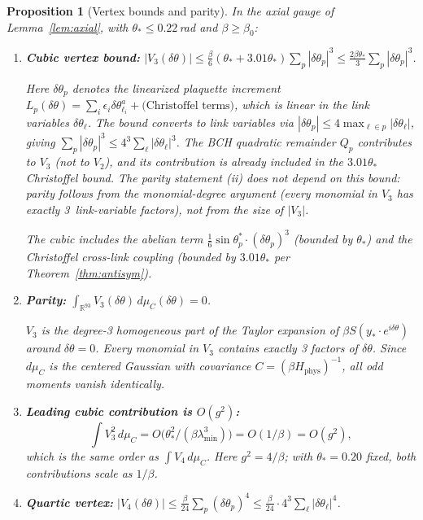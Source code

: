 \documentclass[11pt]{article}
\newtheorem{proposition}[theorem]{Proposition}
\theoremstyle{definition}
\newcommand{\R}{\mathbb{R}}
\begin{document}
\begin{proposition}[Vertex bounds and parity]\label{prop:vertex}
In the axial gauge of Lemma~\ref{lem:axial}, with $\theta_*\le 0.22$\,rad
and $\beta\ge\beta_0$:
\begin{enumerate}[nosep,label=(\roman*)]
\item \textbf{Cubic vertex bound:}
$|V_3(\delta\theta)|
\le\frac{\beta}{6}(\theta_*+3.01\theta_*)\sum_p|\delta\theta_p|^3
\le\frac{2\beta\theta_*}{3}\sum_p|\delta\theta_p|^3$.

Here $\delta\theta_p$ denotes the \emph{linearized plaquette
increment} $L_p(\delta\theta)=\sum_i\epsilon_i\delta\theta_{\ell_i}^a
+\text{(Christoffel terms)}$, which is \emph{linear} in the
link variables $\delta\theta_\ell$.  The bound converts to link
variables via $|\delta\theta_p|\le 4\max_{\ell\in p}
|\delta\theta_\ell|$, giving
$\sum_p|\delta\theta_p|^3\le 4^3\sum_\ell|\delta\theta_\ell|^3$.
The BCH quadratic remainder $Q_p$ contributes to $V_3$ (not to
$V_2$), and its contribution is already included in the
$3.01\theta_*$ Christoffel bound.
\emph{The parity statement (ii) does not depend on this bound}:
parity follows from the monomial-degree argument (every monomial
in $V_3$ has exactly 3~link-variable factors), not from the
size of $|V_3|$.

The cubic includes the abelian term
$\frac{1}{6}\sin\theta_p^*\cdot(\delta\theta_p)^3$ (bounded by
$\theta_*$) and the Christoffel cross-link coupling
(bounded by $3.01\theta_*$ per Theorem~\ref{thm:antisym}).

\item \textbf{Parity:}
$\int_{\R^{93}} V_3(\delta\theta)\,d\mu_C(\delta\theta) = 0$.

$V_3$ is the degree-3 homogeneous part of the Taylor expansion
of $\beta S(y_*\cdot e^{i\delta\theta})$ around $\delta\theta=0$.
Every monomial in $V_3$ contains \emph{exactly 3} factors of
$\delta\theta$.  Since $d\mu_C$ is the centered Gaussian with
covariance $C=(\beta H_{\mathrm{phys}})^{-1}$, all odd moments
vanish identically.

\item \textbf{Leading cubic contribution is $O(g^2)$:}
\begin{equation}\label{eq:V3sq-scale}
\int V_3^2\,d\mu_C=O\bigl(\theta_*^2/(\beta\lambda_{\min}^3)\bigr)
=O(1/\beta)=O(g^2),
\end{equation}
which is the same order as $\int V_4\,d\mu_C$.  Here $g^2=4/\beta$;
with $\theta_*=0.20$ fixed, both contributions scale as $1/\beta$.

\item \textbf{Quartic vertex:}
$|V_4(\delta\theta)|
\le\frac{\beta}{24}\sum_p(\delta\theta_p)^4
\le\frac{\beta}{24}\cdot 4^3\sum_\ell|\delta\theta_\ell|^4$.
\end{enumerate}
\end{proposition}
\end{document}
